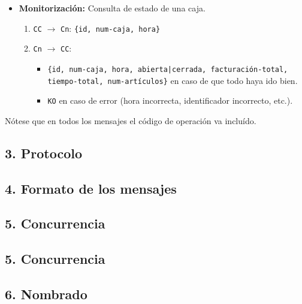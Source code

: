 \begin{itemize}
    \item \textbf{Monitorización:} Consulta de estado de una caja.
    \begin{enumerate}
        \item \texttt{CC} $\rightarrow$ \texttt{Cn}: \texttt{\{id, num-caja, hora\}}
        \item \texttt{Cn} $\rightarrow$ \texttt{CC}: 
        \begin{itemize}
            \item \texttt{\{id, num-caja, hora, abierta|cerrada, facturación-total,\\
            tiempo-total, num-artículos\}} en caso de que todo haya ido bien.
            \item \texttt{KO} en caso de error (hora incorrecta, identificador incorrecto, etc.).
        \end{itemize}
    \end{enumerate}
\end{itemize}

Nótese que en todos los mensajes el código de operación va incluído.

\subsection*{3. Protocolo}




\subsection*{4. Formato de los mensajes}




\subsection*{5. Concurrencia}




\subsection*{5. Concurrencia}




\subsection*{6. Nombrado}


